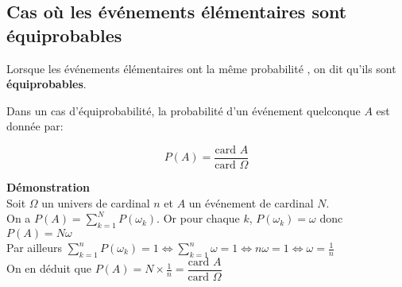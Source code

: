 \subsection*{Cas où les événements élémentaires sont équiprobables }

Lorsque les événements élémentaires ont la même probabilité , on dit qu’ils sont \textbf{ équiprobables}.
\begin{property}
Dans un cas d’équiprobabilité, la probabilité d’un événement quelconque  $A$ est donnée par:

$$ P(A)=\dfrac{\text{card }A}{\text{card } \Omega}$$
\end{property}
\textbf{Démonstration}\\
Soit $ \Omega $ un univers  de cardinal $ n$
et  $ A $ un événement de cardinal $ N. $\\
On a $ P(A)= \displaystyle\sum_{k=1}^N P(\omega_{k})$. Or pour chaque $ k $,  $ P (\omega_{k})=\omega $  donc $ P(A)=N \omega $\\
Par ailleurs $ \displaystyle \sum_{k=1}^n P(\omega_{k})=1  \Longleftrightarrow  \sum_{k=1}^n  \omega=1  \Longleftrightarrow n \omega =1 \Longleftrightarrow \omega =\frac{1}{n}$\\ On en déduit que $ P(A)=N\times   \frac{1}{n}= \dfrac{\text{card }A}{\text{card } \Omega}$

